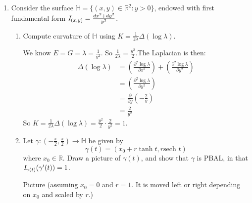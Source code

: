 \documentclass[a4paper,17pt]{extarticle}
\theoremstyle{definition}
\renewcommand{\skip}{\par\null\par}
\newcommand{\R}{\mathbb{R}}
\begin{document}
\begin{enumerate}
\begin{proof}
$$\Gamma_{12}^1=\frac{1}{2}\frac{\lambda_v}{\lambda}\ \Gamma_{12}^2=\frac{1}{2}\frac{\lambda_u}{\lambda}$$
$$\Gamma_{22}^1=-\frac{1}{2}\frac{\lambda_u}{\lambda},\ \gamma_{22}^2=\frac{1}{2}\frac{\lambda_v}{\lambda}$$
Therefore the first geodesic equation becomes $$u''+(u')^2\frac{1}{2}\frac{\lambda_u}{\lambda}+2u'v'\frac{1}{2}\frac{\lambda_v}{\lambda}+(v')^2(-\frac{1}{2}\frac{\lambda_u}{\lambda})=0$$ Then, multiplying everything by $2\lambda$ to get rid of the denominator: $$\implies 2\lambda u''+(u')^2\lambda_u+2u'v'\lambda_v-(v')^2\lambda_u=0$$ As required. The second equation follows similarly.
\end{proof}
\item Consider the surface $\mathbb{H}=\{(x,y)\in\R^2:y>0\}$, endowed with first fundamental form $\emph{I}_{(x,y)}=\frac{dx^2+dy^2}{y^2}$.\begin{enumerate}[label=(\roman*)]
    \item Compute curvature of $\mathbb{H}$ using $K=\frac{1}{2\lambda}\Delta(\log{\lambda})$.\skip We know $E=G=\lambda=\frac{1}{y^2}$. So $\frac{1}{2\lambda}=\frac{y^2}{2}$.\newline The Laplacian is then:\begin{align*}
        \Delta(\log\lambda)&=\left(\frac{\partial^2\log\lambda}{\partial x^2}\right)+\left(\frac{\partial^2\log\lambda}{\partial y^2}\right)\\
        &=\left(\frac{\partial^2\log\lambda}{\partial y^2}\right)\\
        &=\frac{\partial}{\partial y}\left(-\frac{2}{y}\right)\\
        &=\frac{2}{y^2}
    \end{align*}
    So $K=\frac{1}{2\lambda}\Delta(\log{\lambda})=\frac{y^2}{2}\cdot\frac{2}{y^2}=1$.
    \item Let $\gamma:\left(-\frac{\pi}{2},\frac{\pi}{2}\right)\to\mathbb{H}$ be given by $$\gamma(t)=(x_0+r\tanh{t},r\text{sech }t)$$ where $x_0\in\R$. Draw a picture of $\gamma(t)$, and show that $\gamma$ is PBAL, in that $\emph{I}_{\gamma(t)}(\gamma'(t))=1$.\skip Picture (assuming $x_0=0$ and $r=1$. It is moved left or right depending on $x_0$ and scaled by $r$.)\newline\begin{center}

\end{center}
\end{enumerate}
\end{enumerate}
\end{document}
